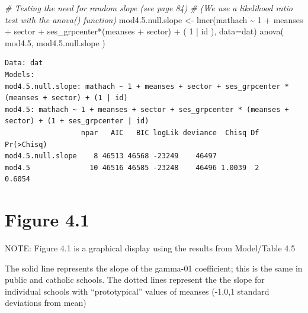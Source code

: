 \documentclass[
  letterpaper,
  DIV=11,
  numbers=noendperiod]{scrreprt}
\newenvironment{Shaded}{\begin{snugshade}}{\end{snugshade}}
\newcommand{\AttributeTok}[1]{\textcolor[rgb]{0.49,0.56,0.16}{#1}}
\newcommand{\CommentTok}[1]{\textcolor[rgb]{0.38,0.63,0.69}{\textit{#1}}}
\newcommand{\DecValTok}[1]{\textcolor[rgb]{0.25,0.63,0.44}{#1}}
\newcommand{\FloatTok}[1]{\textcolor[rgb]{0.25,0.63,0.44}{#1}}
\newcommand{\FunctionTok}[1]{\textcolor[rgb]{0.02,0.16,0.49}{#1}}
\newcommand{\NormalTok}[1]{\textcolor[rgb]{0.00,0.44,0.13}{#1}}
\newcommand{\OtherTok}[1]{\textcolor[rgb]{0.00,0.44,0.13}{#1}}
\newcommand{\SpecialCharTok}[1]{\textcolor[rgb]{0.25,0.44,0.63}{#1}}
\begin{document}
\begin{Shaded}
\begin{Highlighting}[]
\CommentTok{\# Testing the need for random slope  (see page 84)}
\CommentTok{\# (We use a likelihood ratio test with the anova() function)}
\NormalTok{mod4.}\FloatTok{5.}\NormalTok{null.slope }\OtherTok{\textless{}{-}} \FunctionTok{lmer}\NormalTok{(mathach }\SpecialCharTok{\textasciitilde{}} \DecValTok{1} \SpecialCharTok{+}\NormalTok{ meanses }\SpecialCharTok{+}\NormalTok{ sector }\SpecialCharTok{+}\NormalTok{ ses\_grpcenter}\SpecialCharTok{*}\NormalTok{(meanses }\SpecialCharTok{+}\NormalTok{ sector) }\SpecialCharTok{+}\NormalTok{ ( }\DecValTok{1} \SpecialCharTok{|}\NormalTok{ id ), }\AttributeTok{data=}\NormalTok{dat) }
\FunctionTok{anova}\NormalTok{( mod4}\FloatTok{.5}\NormalTok{, mod4.}\FloatTok{5.}\NormalTok{null.slope )}
\end{Highlighting}
\end{Shaded}

\begin{verbatim}
Data: dat
Models:
mod4.5.null.slope: mathach ~ 1 + meanses + sector + ses_grpcenter * (meanses + sector) + (1 | id)
mod4.5: mathach ~ 1 + meanses + sector + ses_grpcenter * (meanses + sector) + (1 + ses_grpcenter | id)
                  npar   AIC   BIC logLik deviance  Chisq Df Pr(>Chisq)
mod4.5.null.slope    8 46513 46568 -23249    46497                     
mod4.5              10 46516 46585 -23248    46496 1.0039  2     0.6054
\end{verbatim}

\hypertarget{figure-4.1}{%
\section{Figure 4.1}\label{figure-4.1}}

NOTE: Figure 4.1 is a graphical display using the results from
Model/Table 4.5

The solid line represents the slope of the gamma-01 coefficient; this is
the same in public and catholic schools. The dotted lines represent the
the slope for individual schools with ``prototypical'' values of meanses
(-1,0,1 standard deviations from mean)
\end{document}
